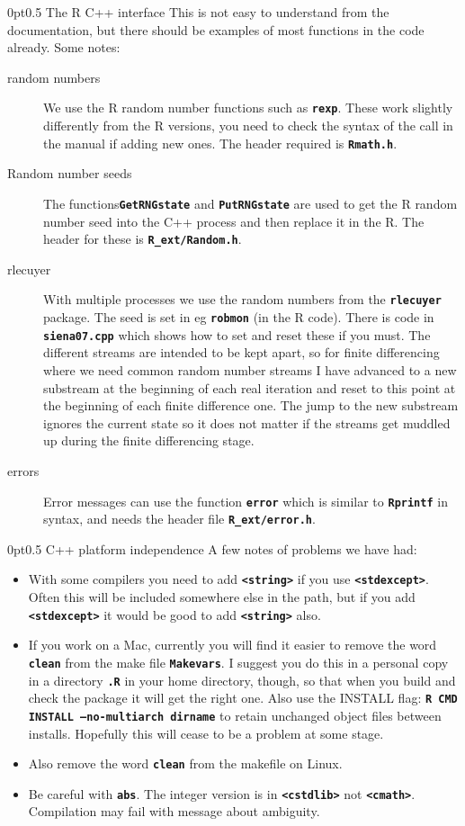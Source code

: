 \documentclass[12pt, a4paper]{article}
\makeatletter
\renewcommand{\=}{\,=\,}
\newcommand{\+}{\,+\,}
\newcommand{\sfn}[1]{\textbf{\texttt{#1}}}
\renewcommand{\section}{\@startsection{section}{1}
                {0pt}{\baselineskip}{0.5\baselineskip}
                {\centering\sffamily} }
\makeatother
\begin{document}
\section{The R C++ interface}
This is not easy to understand from the documentation, but there should be
examples of most functions in the code already. Some notes:
\begin{description}
\item[random numbers]
We use the R random number functions such as \sfn{rexp}. These work slightly
differently from the R versions, you need to check the syntax of the call in
the manual if adding new ones. The header required is \sfn{Rmath.h}.
\item[Random number seeds] The functions\sfn{GetRNGstate} and
\sfn{PutRNGstate}  are used to get the R random number seed into the C++
process and then replace it in the R. The header for these is
\sfn{R\_ext/Random.h}.
\item[rlecuyer]
With multiple processes we use the random numbers from the \sfn{rlecuyer}
package. The seed is set in eg \sfn{robmon} (in the R code). There is code in
\sfn{siena07.cpp} which shows how to set and reset these if you must. The
different streams are intended to be kept apart, so for finite differencing
where we need common random number streams I have advanced to a new substream at
the beginning of each real iteration and reset to this point at the beginning of
each finite difference one. The jump to the new substream ignores the current
state so it does not matter if the streams get muddled up during the finite
differencing stage.
\item[errors]
Error messages can use the function \sfn{error} which is similar to
\sfn{Rprintf} in syntax, and needs the header file \sfn{R\_ext/error.h}.
\end{description}
\section{C++ platform independence}
A few notes of problems we have had:
\begin{itemize}
\item With some compilers you need to add \sfn{<string>} if you use
  \sfn{<stdexcept>}. Often this will be included somewhere else in the path, but
  if you add \sfn{<stdexcept>} it would be good to add \sfn{<string>} also.
  \item If you work on a Mac, currently you will find it easier to remove the
    word \sfn{clean} from the make file \sfn{Makevars}. I suggest you do this in
    a personal copy in a directory \sfn{.R} in your home directory, though, so
    that when you build and check the package it will get the right one. Also
    use the INSTALL flag: \sfn{R CMD INSTALL --no-multiarch dirname} to retain
    unchanged object files between installs. Hopefully this will cease to be a
    problem at some stage.
\item Also remove the word \sfn{clean} from the makefile on Linux.
  \item Be careful with \sfn{abs}. The integer version is in \sfn{<cstdlib>} not
    \sfn{<cmath>}. Compilation may fail with message about ambiguity.
\end{itemize}
\end{document}
